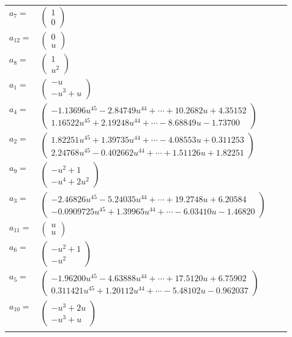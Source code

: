 \documentclass[1p]{elsarticle_modified}
\theoremstyle{definition}
\begin{document}
\begin{tabular}{m{7pt} m{180pt} m{7pt} m{180pt} }
\flushright $a_{7}=$&$\begin{pmatrix}1\\0\end{pmatrix}$ \\
\flushright $a_{12}=$&$\begin{pmatrix}0\\u\end{pmatrix}$ \\
\flushright $a_{8}=$&$\begin{pmatrix}1\\u^2\end{pmatrix}$ \\
\flushright $a_{1}=$&$\begin{pmatrix}- u\\- u^3+u\end{pmatrix}$ \\
\flushright $a_{4}=$&$\begin{pmatrix}-1.13696 u^{45}-2.84749 u^{44}+\cdots+10.2682 u+4.35152\\1.16522 u^{45}+2.19248 u^{44}+\cdots-8.68849 u-1.73700\end{pmatrix}$ \\
\flushright $a_{2}=$&$\begin{pmatrix}1.82251 u^{45}+1.39735 u^{44}+\cdots-4.08553 u+0.311253\\2.24768 u^{45}-0.402662 u^{44}+\cdots+1.51126 u+1.82251\end{pmatrix}$ \\
\flushright $a_{9}=$&$\begin{pmatrix}- u^2+1\\- u^4+2 u^2\end{pmatrix}$ \\
\flushright $a_{3}=$&$\begin{pmatrix}-2.46826 u^{45}-5.24035 u^{44}+\cdots+19.2748 u+6.20584\\-0.0909725 u^{45}+1.39965 u^{44}+\cdots-6.03410 u-1.46820\end{pmatrix}$ \\
\flushright $a_{11}=$&$\begin{pmatrix}u\\u\end{pmatrix}$ \\
\flushright $a_{6}=$&$\begin{pmatrix}- u^2+1\\- u^2\end{pmatrix}$ \\
\flushright $a_{5}=$&$\begin{pmatrix}-1.96200 u^{45}-4.63888 u^{44}+\cdots+17.5120 u+6.75902\\0.311421 u^{45}+1.20112 u^{44}+\cdots-5.48102 u-0.962037\end{pmatrix}$ \\
\flushright $a_{10}=$&$\begin{pmatrix}- u^3+2 u\\- u^3+u\end{pmatrix}$\\&\end{tabular}
\end{document}
